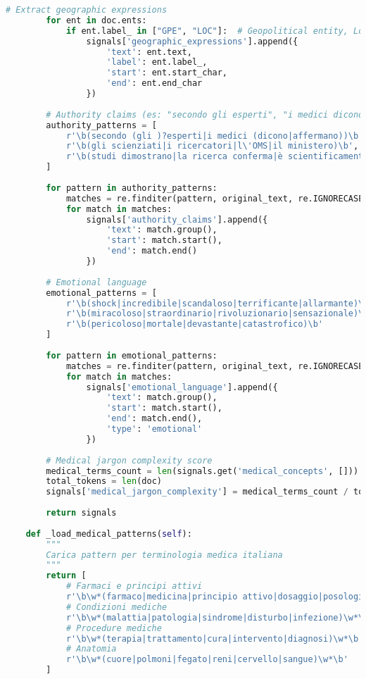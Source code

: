 \documentclass[12pt,a4paper]{report}
\begin{document}
\begin{lstlisting}[language=Python, caption=NLP Processing Pipeline]
        # Extract geographic expressions
        for ent in doc.ents:
            if ent.label_ in ["GPE", "LOC"]:  # Geopolitical entity, Location
                signals['geographic_expressions'].append({
                    'text': ent.text,
                    'label': ent.label_,
                    'start': ent.start_char,
                    'end': ent.end_char
                })
        
        # Authority claims (es: "secondo gli esperti", "i medici dicono")
        authority_patterns = [
            r'\b(secondo (gli )?esperti|i medici (dicono|affermano))\b',
            r'\b(gli scienziati|i ricercatori|l\'OMS|il ministero)\b',
            r'\b(studi dimostrano|la ricerca conferma|è scientificamente provato)\b'
        ]
        
        for pattern in authority_patterns:
            matches = re.finditer(pattern, original_text, re.IGNORECASE)
            for match in matches:
                signals['authority_claims'].append({
                    'text': match.group(),
                    'start': match.start(),
                    'end': match.end()
                })
        
        # Emotional language
        emotional_patterns = [
            r'\b(shock|incredibile|scandaloso|terrificante|allarmante)\b',
            r'\b(miracoloso|straordinario|rivoluzionario|sensazionale)\b',
            r'\b(pericoloso|mortale|devastante|catastrofico)\b'
        ]
        
        for pattern in emotional_patterns:
            matches = re.finditer(pattern, original_text, re.IGNORECASE)
            for match in matches:
                signals['emotional_language'].append({
                    'text': match.group(),
                    'start': match.start(),
                    'end': match.end(),
                    'type': 'emotional'
                })
        
        # Medical jargon complexity score
        medical_terms_count = len(signals.get('medical_concepts', []))
        total_tokens = len(doc)
        signals['medical_jargon_complexity'] = medical_terms_count / total_tokens if total_tokens > 0 else 0
        
        return signals
    
    def _load_medical_patterns(self):
        """
        Carica pattern per terminologia medica italiana
        """
        return [
            # Farmaci e principi attivi
            r'\b\w*(farmaco|medicina|principio attivo|dosaggio|posologia)\w*\b',
            # Condizioni mediche
            r'\b\w*(malattia|patologia|sindrome|disturbo|infezione)\w*\b',
            # Procedure mediche
            r'\b\w*(terapia|trattamento|cura|intervento|diagnosi)\w*\b',
            # Anatomia
            r'\b\w*(cuore|polmoni|fegato|reni|cervello|sangue)\w*\b'
        ]
\end{lstlisting}
\end{document}
